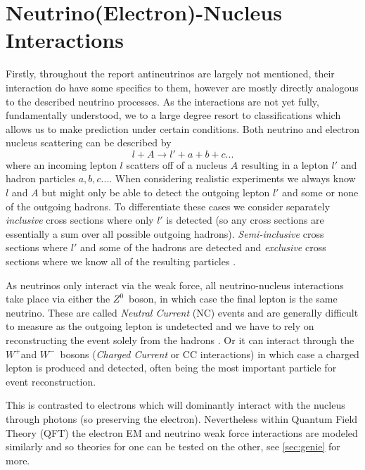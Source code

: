 \documentclass[a4paper,12pt]{article}
\newcommand{\Zz}{$Z^0$}
\newcommand{\Wp}{$W^+$}
\newcommand{\Wm}{$W^-$}
\begin{document}
\section{Neutrino(Electron)-Nucleus Interactions}\label{sec:nenuc_inter}
Firstly, throughout the report antineutrinos are largely not mentioned, their interaction do have some specifics to them, however are mostly directly analogous to the described neutrino processes.
As the interactions are not yet fully, fundamentally understood, we to a large degree resort to classifications which allows us to make prediction under certain conditions.
Both neutrino and electron nucleus scattering can be described by
\begin{equation}\label{eq:genint}
    l + A \rightarrow l' + a + b + c ...
\end{equation}
where an incoming lepton $l$ scatters off of a nucleus $A$ resulting in a lepton $l'$ and hadron particles $a, b, c ...$.
When considering realistic experiments we always know $l$ and $A$ but might only be able to detect the outgoing lepton $l'$ and some or none of the outgoing hadrons. 
To differentiate these cases we consider separately \emph{inclusive} cross sections where only $l'$ is detected (so any cross sections are essentially a sum over all possible outgoing hadrons).
\emph{Semi-inclusive} cross sections where $l'$ and some of the hadrons are detected and \emph{exclusive} cross sections where we know all of the resulting particles \cite{amaroElectronNeutrinonucleusScattering2020}.

As neutrinos only interact via the weak force, all neutrino-nucleus interactions take place via either the \Zz\ boson, in which case the final lepton is the same neutrino.
These are called \emph{Neutral Current} (NC) events and are generally difficult to measure as the outgoing lepton is undetected and we have to rely on reconstructing the event solely from the hadrons \cite{giustiNeutralCurrentNeutrinonucleus2020}.
Or it can interact through the \Wp and \Wm\ bosons (\emph{Charged Current} or CC interactions) in which case a charged lepton is produced and detected, often being the most important particle for event reconstruction.

This is contrasted to electrons which will dominantly interact with the nucleus through photons (so preserving the electron).
Nevertheless within Quantum Field Theory (QFT) the electron EM and neutrino weak force interactions are modeled similarly and so theories for one can be tested on the other, see \cref{sec:genie} for more.
\end{document}

